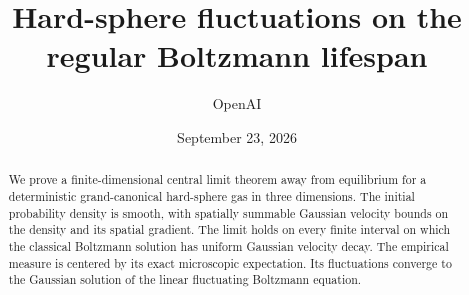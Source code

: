 \documentclass[11pt,reqno]{amsart}
\title[Hard-sphere fluctuations]{Hard-sphere fluctuations on the regular Boltzmann lifespan}
\author{OpenAI}
\date{September 23, 2026}
\theoremstyle{definition}
\theoremstyle{remark}
\numberwithin{equation}{section}
\begin{document}
\begin{abstract}
We prove a finite-dimensional central limit theorem away from equilibrium
for a deterministic grand-canonical hard-sphere gas in three dimensions.
The initial probability density is smooth, with spatially summable
Gaussian velocity bounds on the density and its spatial gradient.
The limit holds on every finite interval on which the classical Boltzmann
solution has uniform Gaussian velocity decay.
The empirical measure is centered by its exact microscopic expectation.
Its fluctuations converge to the Gaussian solution of the linear
fluctuating Boltzmann equation.
\end{abstract}
\maketitle
\tableofcontents
\clearpage










\end{document}
